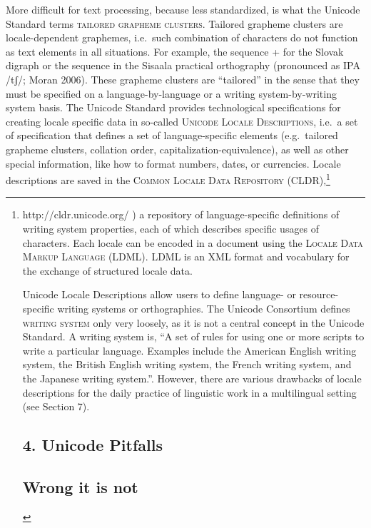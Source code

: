 {{{{{{{{{{{{{{{More difficult for text processing, because less standardized, is what the Unicode Standard terms \textsc{tailored grapheme clusters}. Tailored grapheme clusters are locale-dependent graphemes, i.e.~such combination of characters do not function as text elements in all situations. For example, the sequence + for the Slovak digraph or the sequence in the Sisaala practical orthography (pronounced as IPA /tʃ/; Moran 2006). These grapheme clusters are ``tailored'' in the sense that they must be specified on a language-by-language or a writing system-by-writing system basis. The Unicode Standard provides technological specifications for creating locale specific data in so-called \textsc{Unicode Locale Descriptions}, i.e.~a set of specification that defines a set of language-specific elements (e.g.~tailored grapheme clusters, collation order, capitalization-equivalence), as well as other special information, like how to format numbers, dates, or currencies. Locale descriptions are saved in the \textsc{Common Locale Data Repository (CLDR)},\footnote{http://cldr.unicode.org/ ) a repository of language-specific definitions of writing system properties, each of which describes specific usages of characters. Each locale can be encoded in a document using the \textsc{Locale Data Markup Language (LDML)}. LDML is an XML format and vocabulary for the exchange of structured locale data.

Unicode Locale Descriptions allow users to define language- or resource-specific writing systems or orthographies. The Unicode Consortium defines \textsc{writing system} only very loosely, as it is not a central concept in the Unicode Standard. A writing system is, ``A set of rules for using one or more scripts to write a particular language. Examples include the American English writing system, the British English writing system, the French writing system, and the Japanese writing system.''. However, there are various drawbacks of locale descriptions for the daily practice of linguistic work in a multilingual setting (see Section 7).

\section{4. Unicode Pitfalls}\label{unicode-pitfalls}

\subsection{Wrong it is not}\label{wrong-it-is-not}

}}}}}}}}}}}}}}}}
